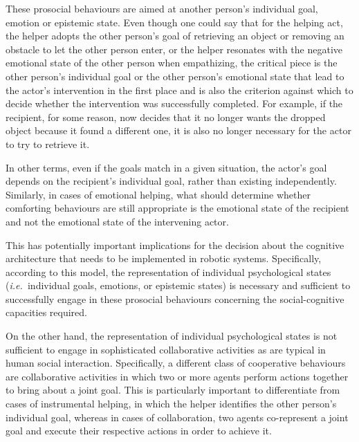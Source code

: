 \documentclass{article}
\newcommand{\ie}{{\textit{i.e.~}}}
\begin{document}
These prosocial behaviours are aimed at another person's individual goal,
emotion or epistemic state. Even though one could say that for the helping act,
the helper adopts the other person's goal of retrieving an object or removing
an obstacle to let the other person enter, or the helper resonates with the
negative emotional state of the other person when empathizing, the critical
piece is the other person's individual goal or the other person's emotional
state that lead to the actor's intervention in the first place and is also
the criterion against which to decide whether the intervention was successfully
completed. For example, if the recipient, for some reason, now decides that it no
longer wants the dropped object because it found a different one, it is also no
longer necessary for the actor to try to retrieve it.

In other terms, even if
the goals match in a given situation, the actor's goal depends on the
recipient's individual goal, rather than existing independently. Similarly,
in cases of emotional helping, what should determine whether comforting
behaviours are still appropriate is the emotional state of the recipient and not
the emotional state of the intervening actor.

This has potentially important implications for the decision about the
cognitive architecture that needs to be implemented in robotic systems.
Specifically, according to this model, the representation of individual
psychological states (\ie individual goals, emotions, or epistemic states) is
necessary and sufficient to successfully engage in these prosocial behaviours
concerning the social-cognitive capacities required. 

On the other hand, the representation of individual psychological states is not
sufficient to engage in sophisticated collaborative activities as are typical
in human social interaction. Specifically, a different class of cooperative
behaviours are collaborative activities in which two or more agents perform
actions together to bring about a joint goal. This is particularly important to
differentiate from cases of instrumental helping, in which the helper
identifies the other person's individual goal, whereas in cases of
collaboration, two agents co-represent a joint goal and execute their
respective actions in order to achieve it. 
\end{document}
